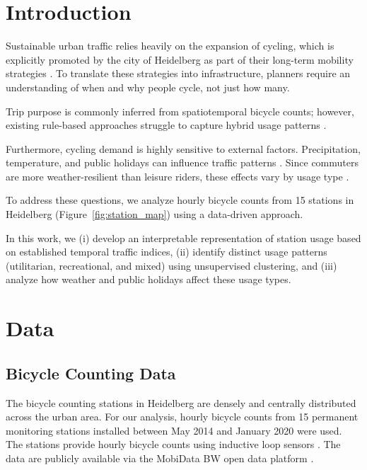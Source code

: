 \documentclass{article}
\begin{document}

\section{Introduction}\label{sec:intro}

Sustainable urban traffic relies heavily on the expansion of cycling, which is explicitly promoted by the city of Heidelberg as part of their long-term mobility strategies \cite{heidelberg_radstrategie_2030}. 
To translate these strategies into infrastructure, planners require an understanding of when and why people cycle, not just how many.

Trip purpose is commonly inferred from spatiotemporal bicycle counts; however, existing rule-based approaches struggle to capture hybrid usage patterns \cite{american_bike_patterns}.

Furthermore, cycling demand is highly sensitive to external factors.
Precipitation, temperature, and public holidays can influence traffic patterns \cite{liu2015_weather_mode_choice_sweden, rudloff2014_weather_transport_vienna, cools2007_holidays_traffic}. 
Since commuters are more weather-resilient than leisure riders, these effects vary by usage type \cite{heinen2011_day_to_day_bicycle}. 

To address these questions, we analyze hourly bicycle counts from 15 stations in Heidelberg (Figure~\ref{fig:station_map}) using a data-driven approach.

In this work, we (i) develop an interpretable representation of station usage based on established temporal traffic indices, (ii) identify distinct usage patterns (utilitarian, recreational, and mixed) using unsupervised clustering, and (iii) analyze how weather and public holidays affect these usage types.

\section{Data}\label{sec:data}
\subsection{Bicycle Counting Data}
The bicycle counting stations in Heidelberg are densely and centrally distributed across the urban area. For our analysis, hourly bicycle counts from 15 permanent monitoring stations installed between May 2014 and January 2020 were used.
The stations provide hourly bicycle counts using inductive loop sensors \cite{ecocounter_zelt}.
The data are publicly available via the MobiData BW open data platform \cite{mobidatabw_api}.
\end{document}
